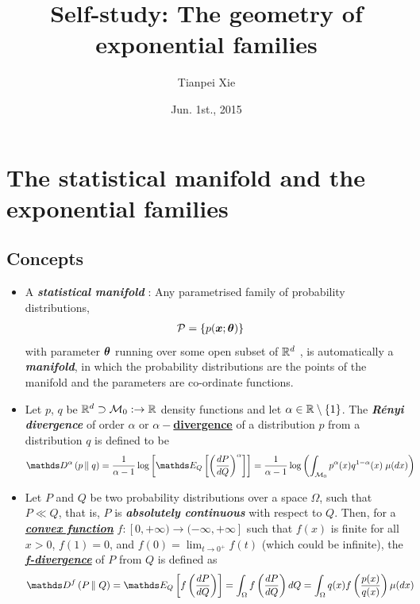 \documentclass[11pt]{article}
\begin{document}
\title{Self-study: The geometry of exponential families}
\author{ Tianpei Xie}
\date{ Jun. 1st., 2015 }
\maketitle
\tableofcontents
\newpage
\section{The statistical manifold and the exponential families}
\subsection{Concepts}
\begin{itemize}
\item A \emph{\textbf{statistical manifold}} \citep{murray1993differential, amari2007methods}: Any parametrised family of probability distributions,
\begin{align*}
{\mathcal P} &= \left\{p(\boldsymbol{x}; \boldsymbol{\theta})\right\} 
\end{align*}
with parameter $\boldsymbol{\theta}$ running over some open subset of ${\mathbb R}^d$ , is automatically a \emph{\textbf{manifold}}, in which the probability distributions are the points of the manifold and the parameters are co-ordinate functions. 

\item \begin{definition}
Let $p$, $q$ be ${\mathbb R}^d \supset {\mathcal M}_{0}: \rightarrow  {\mathbb R}$ density functions and let $\alpha \in {\mathbb R} \setminus \left\{1\right\}$. The \emph{\textbf{R\'enyi divergence}} of order $\alpha$ or \underline{\textbf{$\alpha-$divergence}} of a distribution $p$ from a distribution $q$ is defined to be 
\begin{align}
\divg{\alpha}{p}{q} &= \frac{1}{\alpha -1}\log\brac{\E{Q}{\paren{\frac{dP}{dQ}}^{\alpha}}}  = \frac{1}{\alpha -1}\log\paren{\int_{ \cM_{0}}p^{\alpha}(x)q^{1-\alpha}(x)\;  \mu(dx)} \label{eqn: alpha_divg}
\end{align} 
\end{definition}

\item   \begin{definition}
Let $P$ and $Q$ be two probability distributions over a space $\Omega$, such that  $P\ll Q$, that is, $P$ is \emph{\textbf{absolutely continuous}} with respect to $Q$. Then, for a \underline{\emph{\textbf{convex function}}}  $f: [0, +\infty)\to (-\infty ,+\infty]$ such that $f(x)$ is finite for all $x>0$, \underline{$f(1)=0$}, and  \underline{$f(0)=\lim _{t\to 0^{+}}f(t)$} (which could be infinite), the \underline{\emph{\textbf{f-divergence}}} of $P$ from $Q$ is defined as
\begin{align}
\divg{f}{P}{Q} &= \E{Q}{f\paren{\frac{dP}{dQ}}} =  \int_{\Omega} f\paren{\frac{dP}{dQ}} dQ  =  \int_{\Omega} q(x) f\paren{\frac{p(x)}{q(x)}} \mu(dx)  \label{eqn: f_divg}
\end{align}
\end{definition}
\end{itemize}
\end{document}
